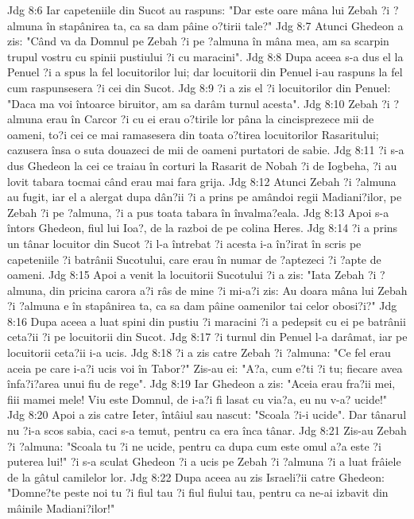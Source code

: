 Jdg 8:6  Iar capeteniile din Sucot au raspuns: "Dar este oare mâna lui Zebah ?i ?almuna în stapânirea ta, ca sa dam pâine o?tirii tale?"
Jdg 8:7  Atunci Ghedeon a zis: "Când va da Domnul pe Zebah ?i pe ?almuna în mâna mea, am sa scarpin trupul vostru cu spinii pustiului ?i cu maracini".
Jdg 8:8  Dupa aceea s-a dus el la Penuel ?i a spus la fel locuitorilor lui; dar locuitorii din Penuel i-au raspuns la fel cum raspunsesera ?i cei din Sucot.
Jdg 8:9  ?i a zis el ?i locuitorilor din Penuel: "Daca ma voi întoarce biruitor, am sa darâm turnul acesta".
Jdg 8:10  Zebah ?i ?almuna erau în Carcor ?i cu ei erau o?tirile lor pâna la cincisprezece mii de oameni, to?i cei ce mai ramasesera din toata o?tirea locuitorilor Rasaritului; cazusera însa o suta douazeci de mii de oameni purtatori de sabie.
Jdg 8:11  ?i s-a dus Ghedeon la cei ce traiau în corturi la Rasarit de Nobah ?i de Iogbeha, ?i au lovit tabara tocmai când erau mai fara grija.
Jdg 8:12  Atunci Zebah ?i ?almuna au fugit, iar el a alergat dupa dân?ii ?i a prins pe amândoi regii Madiani?ilor, pe Zebah ?i pe ?almuna, ?i a pus toata tabara în învalma?eala.
Jdg 8:13  Apoi s-a întors Ghedeon, fiul lui Ioa?, de la razboi de pe colina Heres.
Jdg 8:14  ?i a prins un tânar locuitor din Sucot ?i l-a întrebat ?i acesta i-a în?irat în scris pe capeteniile ?i batrânii Sucotului, care erau în numar de ?aptezeci ?i ?apte de oameni.
Jdg 8:15  Apoi a venit la locuitorii Sucotului ?i a zis: "Iata Zebah ?i ?almuna, din pricina carora a?i râs de mine ?i mi-a?i zis: Au doara mâna lui Zebah ?i ?almuna e în stapânirea ta, ca sa dam pâine oamenilor tai celor obosi?i?"
Jdg 8:16  Dupa aceea a luat spini din pustiu ?i maracini ?i a pedepsit cu ei pe batrânii ceta?ii ?i pe locuitorii din Sucot.
Jdg 8:17  ?i turnul din Penuel l-a darâmat, iar pe locuitorii ceta?ii i-a ucis.
Jdg 8:18  ?i a zis catre Zebah ?i ?almuna: "Ce fel erau aceia pe care i-a?i ucis voi în Tabor?" Zis-au ei: "A?a, cum e?ti ?i tu; fiecare avea înfa?i?area unui fiu de rege".
Jdg 8:19  Iar Ghedeon a zis: "Aceia erau fra?ii mei, fiii mamei mele! Viu este Domnul, de i-a?i fi lasat cu via?a, eu nu v-a? ucide!"
Jdg 8:20  Apoi a zis catre Ieter, întâiul sau nascut: "Scoala ?i-i ucide". Dar tânarul nu ?i-a scos sabia, caci s-a temut, pentru ca era înca tânar.
Jdg 8:21  Zis-au Zebah ?i ?almuna: "Scoala tu ?i ne ucide, pentru ca dupa cum este omul a?a este ?i puterea lui!" ?i s-a sculat Ghedeon ?i a ucis pe Zebah ?i ?almuna ?i a luat frâiele de la gâtul camilelor lor.
Jdg 8:22  Dupa aceea au zis Israeli?ii catre Ghedeon: "Domne?te peste noi tu ?i fiul tau ?i fiul fiului tau, pentru ca ne-ai izbavit din mâinile Madiani?ilor!"
